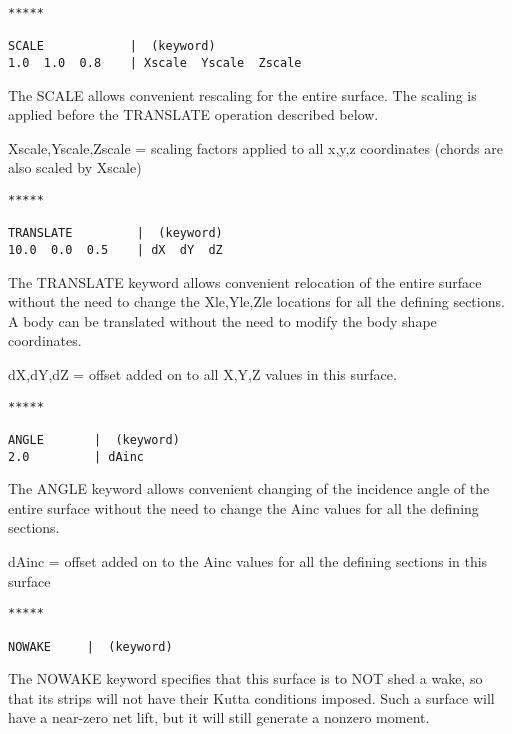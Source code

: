 \begin{lstlisting}
*****

SCALE            |  (keyword)
1.0  1.0  0.8    | Xscale  Yscale  Zscale

\end{lstlisting}


The SCALE allows convenient rescaling for the entire surface.
The scaling is applied before the TRANSLATE operation described below. 

Xscale,Yscale,Zscale  =  scaling factors applied to all x,y,z coordinates
(chords are also scaled by Xscale)\\


\begin{lstlisting}
*****

TRANSLATE         |  (keyword)
10.0  0.0  0.5    | dX  dY  dZ

\end{lstlisting}


The TRANSLATE keyword allows convenient relocation of the entire 
surface without the need to change the Xle,Yle,Zle locations 
for all the defining sections.  A body can be translated without
the need to modify the body shape coordinates.

dX,dY,dZ =  offset added on to all X,Y,Z values in this surface.\\

\begin{lstlisting}
*****

ANGLE       |  (keyword)
2.0         | dAinc

\end{lstlisting}

The ANGLE keyword allows convenient changing of the incidence angle 
of the entire surface without the need to change the Ainc values 
for all the defining sections.  

dAinc =  offset added on to the Ainc values for all the defining sections
in this surface\\

\begin{lstlisting}
*****

NOWAKE     |  (keyword)

\end{lstlisting}

The NOWAKE keyword specifies that this surface is to NOT shed a wake,
so that its strips will not have their Kutta conditions imposed.
Such a surface will have a near-zero net lift, but it will still 
generate a nonzero moment.\\

